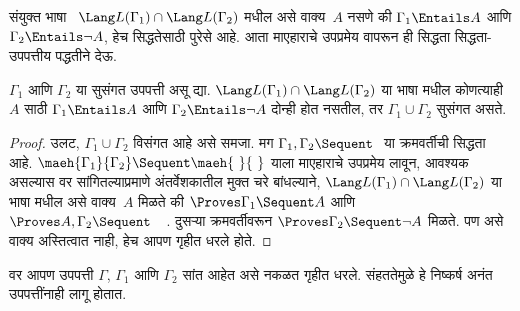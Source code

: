 संयुक्त भाषा~
$\Lang L(\Gamma_1) \cap \Lang L(\Gamma_2)$
मधील असे वाक्य~$A$
नसणे की $\Gamma_1
\Entails A$ आणि
$\Gamma_2 \Entails \lnot A$,
हेच सिद्धतेसाठी पुरेसे आहे.
आता माएहाराचे उपप्रमेय वापरून
ही सिद्धता सिद्धता-उपपत्तीय
पद्धतीने देऊ.

\begin{thm}
$\Gamma_1$ आणि $\Gamma_2$
या सुसंगत उपपत्ती असू द्या.
$\Lang L(\Gamma_1) \cap \Lang L(\Gamma_2)$
या भाषा मधील कोणत्याही~$A$
साठी $\Gamma_1 \Entails A$
आणि $\Gamma_2 \Entails \lnot A$
दोन्ही होत नसतील, तर
$\Gamma_1 \cup \Gamma_2$ सुसंगत असते.
\end{thm}

\begin{proof}
  उलट, $\Gamma_1 \cup \Gamma_2$
  विसंगत आहे असे समजा.
  मग $\Gamma_1, \Gamma_2 \Sequent \ $
  या क्रमवर्तीची सिद्धता आहे.
  $\maeh{\Gamma_1}{\Gamma_2}
  \Sequent \maeh{\ }{\ }$ याला
  माएहाराचे उपप्रमेय लावून, आवश्यक असल्यास वर
  सांगितल्याप्रमाणे अंतर्वेशकातील मुक्त चरे बांधल्याने,
  $\Lang L(\Gamma_1) \cap \Lang L(\Gamma_2)$
  या भाषा मधील असे
  वाक्य~$A$ मिळते की
  $\Proves \Gamma_1 \Sequent A$
  आणि $\Proves A, \Gamma_2 \Sequent
  \quad$. दुसऱ्या क्रमवर्तीवरून
  $\Proves \Gamma_2 \Sequent \lnot A$
  मिळते. पण असे वाक्य
  अस्तित्वात नाही, हेच आपण
  गृहीत धरले होते.
\end{proof}

वर आपण उपपत्ती $\Gamma$,
$\Gamma_1$ आणि $\Gamma_2$
सांत आहेत असे नकळत गृहीत धरले.
संहततेमुळे हे निष्कर्ष
अनंत उपपत्तींनाही लागू होतात.



